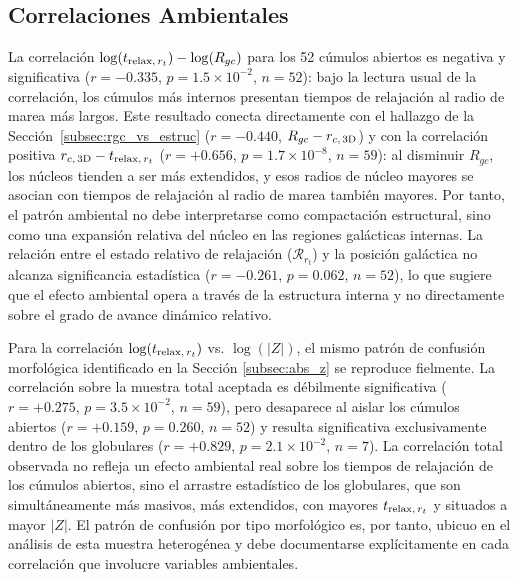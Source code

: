         \subsection{Correlaciones Ambientales}
            
            La correlación $\log(t_{{\rm relax},\, r_t})-\log(R_{gc})$ para los 
            52 cúmulos abiertos es negativa y significativa ($r = -0.335$, 
            $p = 1.5 \times 10^{-2}$, $n = 52$): bajo la lectura usual de la 
            correlación, los cúmulos más internos presentan tiempos de 
            relajación al radio de marea más largos. Este resultado conecta 
            directamente con el hallazgo de la 
            Sección~\ref{subsec:rgc_vs_estruc} ($r = -0.440$, 
            $R_{gc}-r_{c,\, 3{\rm D}}$) y con la correlación positiva 
            $r_{c,\, 3{\rm D}}-t_{{\rm relax},\, r_t}$ ($r = +0.656$, 
            $p = 1.7 \times 10^{-8}$, $n = 59$): al disminuir $R_{gc}$, los 
            núcleos tienden a ser más extendidos, y esos radios de núcleo 
            mayores se asocian con tiempos de relajación al radio de marea 
            también mayores. Por tanto, el patrón ambiental no debe 
            interpretarse como compactación estructural, sino como una expansión 
            relativa del núcleo en las regiones galácticas internas. La relación 
            entre el estado relativo de relajación ($\mathcal{R}_{r_t}$) y la 
            posición galáctica no alcanza significancia estadística 
            ($r = -0.261$, $p = 0.062$, $n = 52$), lo que sugiere que el efecto 
            ambiental opera a través de la estructura interna y no directamente 
            sobre el grado de avance dinámico relativo.

            Para la correlación $\log(t_{{\rm relax},\, r_t})$ vs. $\log(|Z|)$, 
            el mismo patrón de confusión morfológica identificado en la Sección 
            \ref{subsec:abs_z} se reproduce fielmente. La correlación sobre la 
            muestra total aceptada es débilmente significativa ($r = +0.275$, 
            $p = 3.5 \times 10^{-2}$, $n = 59$), pero desaparece al aislar los 
            cúmulos abiertos ($r = +0.159$, $p = 0.260$, $n = 52$) y resulta 
            significativa exclusivamente dentro de los globulares ($r = +0.829$, 
            $p = 2.1 \times 10^{-2}$, $n = 7$). La correlación total observada 
            no refleja un efecto ambiental real sobre los tiempos de relajación 
            de los cúmulos abiertos, sino el arrastre estadístico de los 
            globulares, que son simultáneamente más masivos, más extendidos, con 
            mayores $t_{{\rm relax},\, r_t}$ y situados a mayor $|Z|$. El patrón 
            de confusión por tipo morfológico es, por tanto, ubicuo en el 
            análisis de esta muestra heterogénea y debe documentarse 
            explícitamente en cada correlación que involucre variables 
            ambientales.

